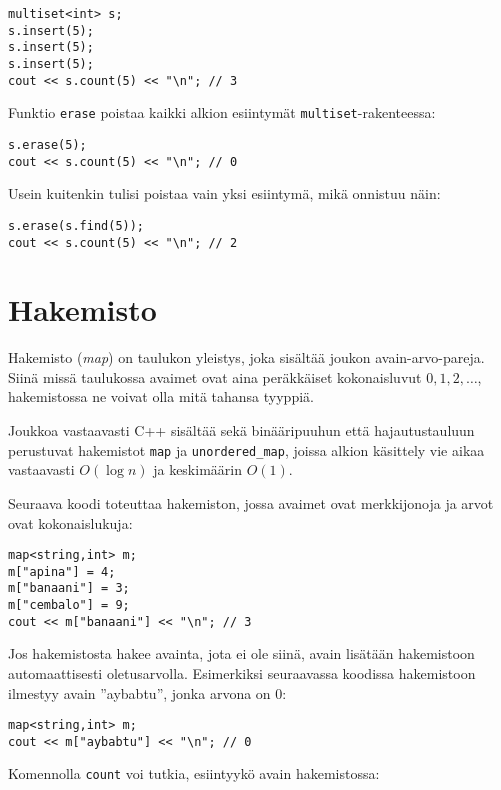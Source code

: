 \begin{lstlisting}
multiset<int> s;
s.insert(5);
s.insert(5);
s.insert(5);
cout << s.count(5) << "\n"; // 3
\end{lstlisting}

Funktio \texttt{erase} poistaa
kaikki alkion esiintymät
\texttt{multiset}-rakenteessa:

\begin{lstlisting}
s.erase(5);
cout << s.count(5) << "\n"; // 0
\end{lstlisting}

Usein kuitenkin tulisi poistaa
vain yksi esiintymä,
mikä onnistuu näin:

\begin{lstlisting}
s.erase(s.find(5));
cout << s.count(5) << "\n"; // 2
\end{lstlisting}

\section{Hakemisto}

Hakemisto (\textit{map}) on taulukon yleistys,
joka sisältää joukon avain-arvo-pareja.
Siinä missä taulukossa avaimet ovat aina peräkkäiset
kokonaisluvut $0,1,2,\ldots$,
hakemistossa ne voivat
olla mitä tahansa tyyppiä.

Joukkoa vastaavasti C++ sisältää sekä
binääripuuhun että hajautustauluun perustuvat
hakemistot \texttt{map} ja \texttt{unordered\_map},
joissa alkion käsittely vie aikaa vastaavasti
$O(\log n)$ ja keskimäärin $O(1)$.

Seuraava koodi toteuttaa hakemiston,
jossa avaimet ovat merkkijonoja ja
arvot ovat kokonaislukuja:

\begin{lstlisting}
map<string,int> m;
m["apina"] = 4;
m["banaani"] = 3;
m["cembalo"] = 9;
cout << m["banaani"] << "\n"; // 3
\end{lstlisting}

Jos hakemistosta hakee avainta,
jota ei ole siinä,
avain lisätään hakemistoon
automaattisesti oletusarvolla.
Esimerkiksi seuraavassa koodissa
hakemistoon ilmestyy avain ''aybabtu'',
jonka arvona on 0:

\begin{lstlisting}
map<string,int> m;
cout << m["aybabtu"] << "\n"; // 0
\end{lstlisting}

Komennolla \texttt{count} voi
tutkia, esiintyykö avain hakemistossa:

